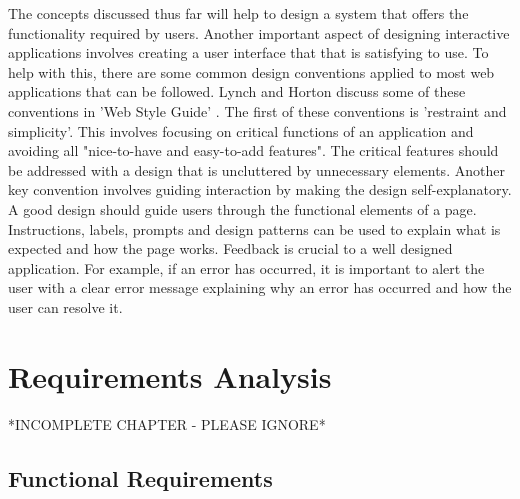 \documentclass[authoryearcitations]{UoYCSproject}
\begin{document}
The concepts discussed thus far will help to design a system that offers the functionality required by users. Another important aspect of designing interactive applications involves creating a user interface that that is satisfying to use. To help with this, there are some common design conventions applied to most web applications that can be followed. Lynch and Horton discuss some of these conventions in 'Web Style Guide' \citep{Lynch2009}. The first of these conventions is 'restraint and simplicity'. This involves focusing on critical functions of an application and avoiding all "nice-to-have and easy-to-add features". The critical features should be addressed with a design that is uncluttered by unnecessary elements. Another key convention involves guiding interaction by making the design self-explanatory. A good design should guide users through the functional elements of a page. Instructions, labels, prompts and design patterns can be used to explain what is expected and how the page works. Feedback is crucial to a well designed application. For example, if an error has occurred, it is important to alert the user with a clear error message explaining why an error has occurred and how the user can resolve it. 


\chapter{Requirements Analysis}


*INCOMPLETE CHAPTER - PLEASE IGNORE*

\section{Functional Requirements}
\end{document}
